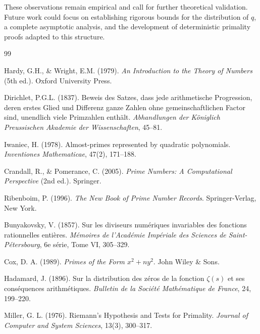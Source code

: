 \documentclass[11pt,a4paper]{article}
\theoremstyle{definition}
\theoremstyle{plain}
\begin{document}
These observations remain empirical and call for further theoretical validation. Future work could focus on establishing rigorous bounds for the distribution of $q$, a complete asymptotic analysis, and the development of deterministic primality proofs adapted to this structure.


\begin{thebibliography}{99}

Hardy, G.H., \& Wright, E.M. (1979). 
\textit{An Introduction to the Theory of Numbers} (5th ed.). 
Oxford University Press.

Dirichlet, P.G.L. (1837). 
Beweis des Satzes, dass jede arithmetische Progression, deren erstes Glied und Differenz ganze Zahlen ohne gemeinschaftlichen Factor sind, unendlich viele Primzahlen enth\"alt. 
\textit{Abhandlungen der K\"oniglich Preussischen Akademie der Wissenschaften}, 45--81.

Iwaniec, H. (1978). Almost-primes represented by quadratic polynomials. 
\textit{Inventiones Mathematicae}, 47(2), 171--188.

Crandall, R., \& Pomerance, C. (2005). 
\textit{Prime Numbers: A Computational Perspective} (2nd ed.). 
Springer.

Ribenboim, P. (1996). 
\textit{The New Book of Prime Number Records}. 
Springer-Verlag, New York.

Bunyakovsky, V. (1857).
Sur les diviseurs num\'eriques invariables des fonctions rationnelles enti\`eres.
\textit{M\'emoires de l'Acad\'emie Imp\'eriale des Sciences de Saint-P\'etersbourg}, 6e s\'erie, Tome VI, 305--329.

Cox, D. A. (1989).
\textit{Primes of the Form $x^2 + ny^2$}.
John Wiley \& Sons.

Hadamard, J. (1896).
Sur la distribution des z\'eros de la fonction $\zeta(s)$ et ses cons\'equences arithm\'etiques.
\textit{Bulletin de la Soci\'et\'e Math\'ematique de France}, 24, 199--220.

Miller, G. L. (1976).
Riemann's Hypothesis and Tests for Primality.
\textit{Journal of Computer and System Sciences}, 13(3), 300--317.


\end{thebibliography}
\end{document}
